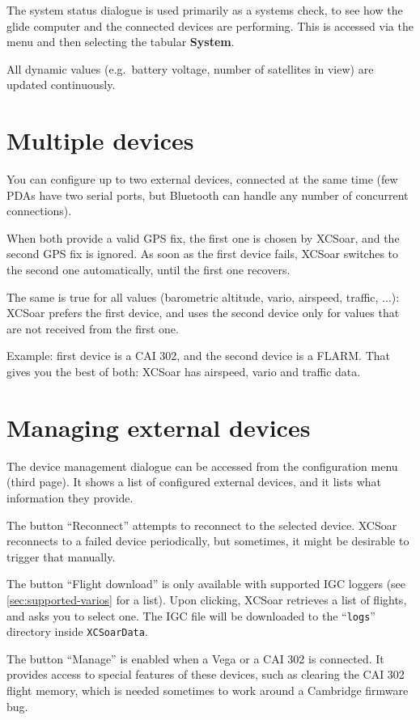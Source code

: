 The system status dialogue is
used primarily as a systems check, to see how the glide computer and the
connected devices are performing.  This is accessed via the menu
and then selecting the tabular {\bf System}.

All dynamic values (e.g.\ battery voltage, number of satellites in
view) are updated continuously.

\section{Multiple devices}

You can configure up to two external devices, connected at the same
time (few PDAs have two serial ports, but Bluetooth can handle any
number of concurrent connections).

When both provide a valid GPS fix, the first one is chosen by XCSoar,
and the second GPS fix is ignored.  As soon as the first device fails,
XCSoar switches to the second one automatically, until the first one
recovers.

The same is true for all values (barometric altitude, vario, airspeed,
traffic, ...): XCSoar prefers the first device, and uses the second
device only for values that are not received from the first one.

Example: first device is a CAI 302, and the second device is a FLARM.
That gives you the best of both: XCSoar has airspeed, vario and
traffic data.


\section{Managing external devices}

The device management dialogue can be accessed from the configuration
menu (third page).  It shows a list of configured external devices,
and it lists what information they provide.

The button ``Reconnect'' attempts to reconnect to the selected
device.  XCSoar reconnects to a failed device periodically, but
sometimes, it might be desirable to trigger that manually.

The button ``Flight download'' is only available with supported IGC
loggers (see \ref{sec:supported-varios} for a list).  Upon clicking,
XCSoar retrieves a list of flights, and asks you to select one.  The
IGC file will be downloaded to the ``\texttt{logs}'' directory inside
\texttt{XCSoarData}.

The button ``Manage'' is enabled when a Vega or a CAI 302 is
connected.  It provides access to special features of these devices,
such as clearing the CAI 302 flight memory, which is needed sometimes
to work around a Cambridge firmware bug.
